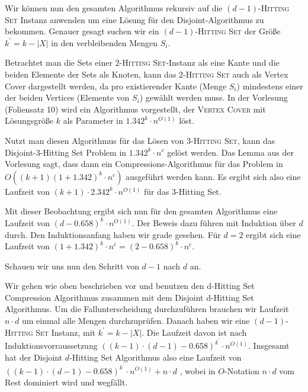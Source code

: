 Wir können nun den gesamten Algorithmus rekursiv auf die $(d-1)$-\textsc{Hitting Set} Instanz anwenden um eine Lösung für den Disjoint-Algorithmus zu bekommen. Genauer gesagt suchen wir ein $(d-1)$-\textsc{Hitting Set} der Größe $k^\prime = k - |X|$ in den verbleibenden Mengen $S_i$.

Betrachtet man die Sets einer $2$-\textsc{Hitting Set}-Instanz als eine Kante und die beiden Elemente der Sets als Knoten, kann das $2$-\textsc{Hitting Set} auch als Vertex Cover dargestellt werden, da pro existierender Kante (Menge $S_i$) mindestens einer der beiden Vertices (Elemente von $S_i$) gewählt werden muss. In der Vorlesung (Foliensatz 10) wird ein Algorithmus vorgestellt, der \textsc{Vertex Cover} mit Lösungsgröße $k$ als Parameter in $1.342^k \cdot n^{O(1)}$ löst. 

Nutzt man diesen Algorithmus für das Lösen von $3$-\textsc{Hitting Set}, kann das Disjoint-3-Hitting Set Problem in $1.342^k \cdot n^c$ gelöst werden. Das Lemma aus der Vorlesung sagt, dass dann ein Compressions-Algorithmus für das Problem in $O((k+1)(1+1.342)^k \cdot n^c)$ ausgeführt werden kann. Es ergibt sich also eine Laufzeit von $(k+1) \cdot 2.342^k \cdot n^{O(1)}$ für das 3-Hitting Set.

Mit dieser Beobachtung ergibt sich nun für den gesamten Algorithmus eine Laufzeit von $(d-0.658)^k \cdot n^{O(1)}$. Der Beweis dazu führen mit Induktion über $d$ durch.
Den Induktionsanfang haben wir grade gesehen. Für $d = 2$ ergibt sich eine Laufzeit von $(1+1.342)^k \cdot n^c = (2-0.658)^k \cdot n^c $.

Schauen wir uns nun den Schritt von $d-1$ nach $d$ an.

Wir gehen wie oben beschrieben vor und benutzen den d-Hitting Set Compression Algorithmus zusammen mit dem Disjoint d-Hitting Set Algorithmus.
Um die Fallunterscheidung durchzuführen brauchen wir Laufzeit $n \cdot d$ um einmal alle Mengen durchzuprüfen. Danach haben wir eine $(d-1)$-\textsc{Hitting Set} Instanz, mit $k^\prime = k - |X|$. Die Laufzeit davon ist nach Induktionsvorraussetzung $((k-1) \cdot (d-1)-0.658)^{k^\prime} \cdot n^{O(1)}$. 
Insgesamt hat der Disjoint $d$-Hitting Set Algorithmus also eine Laufzeit von $((k-1) \cdot (d-1)-0.658)^{k^\prime} \cdot n^{O(1)} + n \cdot d$ , wobei in $O$-Notation $n \cdot d$ vom Rest dominiert wird und wegfällt.

